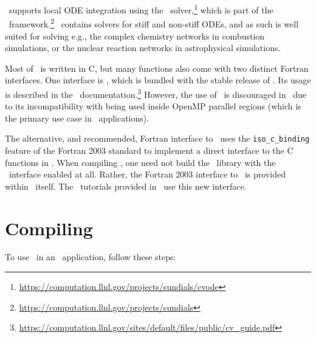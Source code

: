 \amrex\ supports local ODE integration using the \cvode\ solver,\footnote{\url{https://computation.llnl.gov/projects/sundials/cvode}} which is part of the \sundials\ framework.\footnote{\url{https://computation.llnl.gov/projects/sundials}}
\cvode\ contains solvers for stiff and non-stiff ODEs, and as such is well suited for solving e.g., the complex chemistry networks in combustion simulations, or the nuclear reaction networks in astrophysical simulations.

Most of \cvode\ is written in C, but many functions also come with two distinct Fortran interfaces.
One interface is \fcvode, which is bundled with the stable release of \cvode.
Its usage is described in the \cvode\ documentation.\footnote{\url{https://computation.llnl.gov/sites/default/files/public/cv_guide.pdf}}
However, the use of \fcvode\ is discouraged in \amrex\ due to its incompatibility with being used inside OpenMP parallel regions (which is the primary use case in \amrex\ applications).

The alternative, and recommended, Fortran interface to \cvode\ uses the \texttt{iso\_c\_binding} feature of the Fortran 2003 standard to implement a direct interface to the C functions in \cvode.
When compiling \cvode, one need not build the \cvode\ library with the \fcvode\ interface enabled at all.
Rather, the Fortran 2003 interface to \cvode\ is provided within \amrex\ itself.
The \cvode\ tutorials provided in \amrex\ use this new interface.

\section{Compiling \cvode}

To use \cvode\ in an \amrex\ application, follow these steps:

